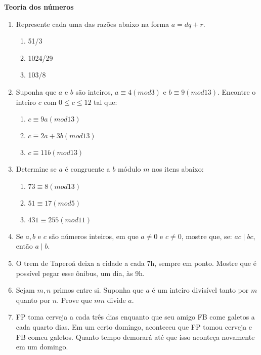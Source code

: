 \documentclass[]{book}
\theoremstyle{definition}
\begin{document}
\vspace{0.2 cm}



\textbf{Teoria dos números}

\begin{enumerate}

\item\label{caushw} Represente cada uma das razões abaixo na forma $a = dq + r$.
\begin{enumerate}
\item 51/3
\item 1024/29
\item 103/8
\end{enumerate}

\item\label{caushw} Suponha que $a$ e $b$ são inteiros, $a \equiv 4 (mod 3)$ e $b \equiv 9 (mod 13)$. Encontre o inteiro $c$ com $0\le c \le 12$ tal que:
\begin{enumerate}
\item $c \equiv 9a(mod 13)$
\item $c \equiv 2a + 3b(mod 13)$
\item $c \equiv 11b(mod 13)$
\end{enumerate}


\item\label{caushw} Determine se $a$ é congruente a $b$ módulo $m$ nos itens abaixo:
\begin{enumerate}

\item $73 \equiv 8(mod 13)$
\item $51 \equiv 17(mod 5)$
\item $431 \equiv 255(mod 11)$

\end{enumerate}

\item\label{caushw} Se $a, b$ e $c$ são números inteiros, em que $a \ne 0$ e $c \ne 0$, mostre que, se: $ac \mid bc$, então $a \mid b$.

\item\label{caushw} O trem de Taperoá deixa a cidade a cada 7h, sempre em ponto. Mostre que é possível pegar esse ônibus, um dia, às 9h.

\item\label{caushw} Sejam $m,n$ primos entre si. Suponha que $a$ é um inteiro divisível tanto por $m$ quanto por $n$. Prove que $mn$ divide $a$.

\item\label{caushw} FP toma cerveja a cada três dias enquanto que seu amigo FB come galetos a cada quarto dias. Em um certo domingo, aconteceu que FP tomou cerveja e FB comeu galetos. Quanto tempo demorará até que isso aconteça novamente em um domingo.


\end{enumerate}
\end{document}
